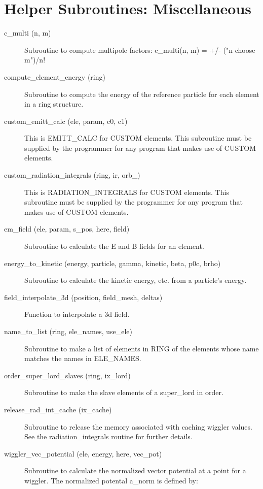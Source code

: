 \section{Helper Subroutines: Miscellaneous}
\label{r:misc_help}

\begin{description}

\item[c\_multi (n, m)] \Newline
Subroutine to compute multipole factors: c\_multi(n, m) = +/- ("n choose m")/n! 

\item[compute\_element\_energy (ring)] \Newline
Subroutine to compute the energy of the reference particle for each element in a ring structure. 

\item[custom\_emitt\_calc (ele, param, c0, c1)] \Newline
This is EMITT\_CALC for CUSTOM elements. This subroutine must be supplied by the programmer for any program that makes use of CUSTOM elements. 

\item[custom\_radiation\_integrals (ring, ir, orb\_)] \Newline
This is RADIATION\_INTEGRALS for CUSTOM elements. This subroutine must be supplied by the programmer for any program that makes use of CUSTOM elements. 

\item[em\_field (ele, param, s\_pos, here, field)] \Newline
Subroutine to calculate the E and B fields for an element. 

\item[energy\_to\_kinetic (energy, particle, gamma, kinetic, beta, p0c, brho)] \Newline
Subroutine to calculate the kinetic energy, etc. from a particle's energy. 

\item[field\_interpolate\_3d (position, field\_mesh, deltas)] \Newline
Function to interpolate a 3d field. 

\item[name\_to\_list (ring, ele\_names, use\_ele)] \Newline
Subroutine to make a list of elements in RING of the elements whose name matches the names in ELE\_NAMES. 

\item[order\_super\_lord\_slaves (ring, ix\_lord)] \Newline
Subroutine to make the slave elements of a super\_lord in order. 

\item[release\_rad\_int\_cache (ix\_cache)] \Newline 
     Subroutine to release the memory associated with caching wiggler values.
     See the radiation\_integrals routine for further details.

\item[wiggler\_vec\_potential (ele, energy, here, vec\_pot)] \Newline
Subroutine to calculate the normalized vector potential at a point for a wiggler. The normalized potental a\_norm is defined by: 

\end{description}

